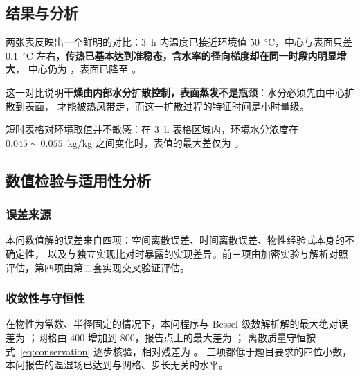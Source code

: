 \subsection{结果与分析}





两张表反映出一个鲜明的对比：$3$~h 内温度已接近环境值 $50$~$^\circ$C，中心与表面只差
$0.1$~$^\circ$C 左右，\textbf{传热已基本达到准稳态，含水率的径向梯度却在同一时段内明显增大}，
中心仍为 \qtwoCcenterthreeh，表面已降至 \qtwoCsurfacethreeh。


这一对比说明\textbf{干燥由内部水分扩散控制，表面蒸发不是瓶颈}：水分必须先由中心扩散到表面，
才能被热风带走，而这一扩散过程的特征时间是小时量级。


短时表格对环境取值并不敏感：在 $3$~h 表格区域内，环境水分浓度在 $0.045\sim0.055$~kg/kg
之间变化时，表值的最大差仅为 \qtwotableregionenvinsensitivity。

\subsection{数值检验与适用性分析}

\subsubsection{误差来源}

本问数值解的误差来自四项：空间离散误差、时间离散误差、物性经验式本身的不确定性，
以及与独立实现比对时暴露的实现差异。前三项由加密实验与解析对照评估，第四项由第二套实现交叉验证评估。

\subsubsection{收敛性与守恒性}

在物性为常数、半径固定的情况下，本问程序与 Bessel 级数解析解的最大绝对误差为
\qtwoanalyticalmaxabserr；网格由 $400$ 增加到 $800$，报告点上的最大差为 \qtwogridrefinementdiff；
离散质量守恒按式~\eqref{eq:conservation} 逐步核验，相对残差为 \qtwomassbalancerel。
三项都低于题目要求的四位小数，本问报告的温湿场已达到与网格、步长无关的水平。



